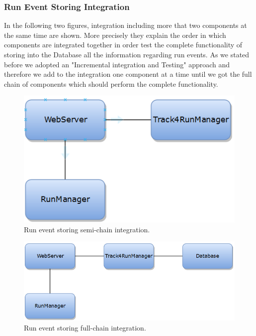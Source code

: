 \subsubsection{Run Event Storing Integration}
In the following two figures, integration including more that two components at the same time are shown. More precisely they explain the order in which components are integrated together in order test the complete functionality of storing into the Database all the information regarding run events. As we stated before we adopted  an "Incremental integration and Testing" approach and therefore we add to the integration one component at a time until we got the full chain of components which should perform the complete functionality.
\begin{figure}[H]
\centering
\includegraphics[scale=0.7]{Images/IntegrationPlanImages/fig17.png}
\caption{Run event storing semi-chain integration.}
\end{figure}

\begin{figure}[H]
\centering
\includegraphics[scale=0.7]{Images/IntegrationPlanImages/fig18.png}
\caption{Run event storing full-chain integration.}
\end{figure}

